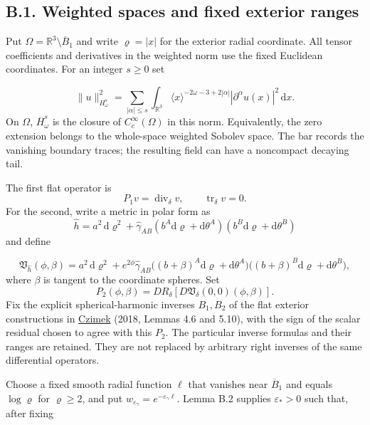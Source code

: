 \documentclass[
  english,
  11pt,
  reqno]{amsart}
\begin{document}
\subsection{B.1. Weighted spaces and fixed exterior
ranges}\label{b.1.-weighted-spaces-and-fixed-exterior-ranges}\label{sec:online-extension-spaces}

Put \(\Omega=\mathbb R^3\setminus\overline B_1\) and write
\(\varrho=|x|\) for the exterior radial coordinate. All tensor
coefficients and derivatives in the weighted norm use the fixed
Euclidean coordinates. For an integer \(s\ge0\) set

\label{eq:online-extension-weighted-norm} \[
\|u\|_{H^s_\omega}^2
=\sum_{|\alpha|\le s}
\int_{\mathbb R^3}
\langle x\rangle^{-2\omega-3+2|\alpha|}
|\partial^\alpha u(x)|^2\,\mathrm d x.
\] On \(\Omega\), \(\overline H^s_\omega\) is the closure of
\(C_c^\infty(\Omega)\) in this norm. Equivalently, the zero extension
belongs to the whole-space weighted Sobolev space. The bar records the
vanishing boundary traces; the resulting field can have a noncompact
decaying tail.

The first flat operator is \[
P_1v=\operatorname{div}_\delta v,
\qquad \operatorname{tr}_\delta v=0.
\] For the second, write a metric in polar form as \[
\widehat h=a^2\,\mathrm d\varrho^2
+\widehat\gamma_{AB}
(b^A\mathrm d\varrho+\mathrm d\theta^A)
(b^B\mathrm d\varrho+\mathrm d\theta^B)
\] and define

\label{eq:online-extension-polar-variation} \[
\mathfrak V_{\widehat h}(\phi,\beta)
=a^2\,\mathrm d\varrho^2
+e^{2\phi}\widehat\gamma_{AB}
\bigl((b+\beta)^A\mathrm d\varrho+\mathrm d\theta^A\bigr)
\bigl((b+\beta)^B\mathrm d\varrho+\mathrm d\theta^B\bigr),
\] where \(\beta\) is tangent to the coordinate spheres. Set \[
P_2(\phi,\beta)
=D R_\delta\!\left[D\mathfrak V_\delta(0,0)(\phi,\beta)\right].
\] Fix the explicit spherical-harmonic inverses \(B_1,B_2\) of the flat
exterior constructions in \hyperref[ref-Czimek2018]{Czimek} (2018,
Lemmas 4.6 and 5.10), with the sign of the scalar residual chosen to
agree with this \(P_2\). The particular inverse formulas and their
ranges are retained. They are not replaced by arbitrary right inverses
of the same differential operators.

Choose a fixed smooth radial function \(\ell\) that vanishes near
\(\overline B_1\) and equals \(\log\varrho\) for \(\varrho\ge2\), and
put \(w_{\varepsilon_\gamma}=e^{-\varepsilon_\gamma\ell}\). Lemma B.2
supplies \(\varepsilon_*>0\) such that, after fixing
\end{document}

